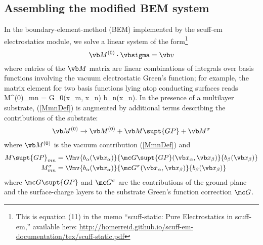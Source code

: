 \documentclass[letterpaper]{article}
\begin{document}
\newpage
\subsection{Assembling the modified BEM system}

In the boundary-element-method (BEM) implemented by the {\sc scuff-em}
electrostatics module, we solve a linear system of the form\footnote{This
is equation (11) in the memo ``{\sc scuff-static}: Pure Electrostatics 
in {\sc scuff-em},'' available here:
\url{http://homerreid.github.io/scuff-em-documentation/tex/scuff-static.pdf}}
$$ \vb M^{(0)} \cdot \vbsigma = \vb v$$
where entries of the $\vb M$ matrix are linear combinations of
integrals over basis functions involving the vacuum electrostatic
Green's function; for example, the matrix element for two basis functions
lying atop conducting surfaces reads
{
  M^{(0)}_{mn} = 
                     {G_0(\vb x_m, \vb x_n)}
                     {b_n(\vb x_n)}.
}
In the presence of a multilayer substrate, (\ref{MmnDef}) is augmented
by additional terms describing the contributions of the substrate:
$$ \vb M^{(0)} \to \vb M^{(0)} + \vb M\supt{GP} + \vb M^\sigma$$
where $\vb M^{(0)}$ is the vacuum contribution (\ref{MmnDef})
and 
\begin{align*}
  M\supt{GP}_{mn} 
   &= \Vmv{b_\alpha(\vb x_\alpha)}
          {\mc G\supt{GP}(\vb x_\alpha, \vb x_\beta)}
          {b_\beta(\vb x_\beta)}
\\
  M^\sigma_{mn} 
   &= \Vmv{b_\alpha(\vb x_\alpha)}
          {\mc G^\sigma(\vb x_\alpha, \vb x_\beta)}
          {b_\beta(\vb x_\beta)}
\end{align*}
where $\mc G\supt{GP}$ and $\mc G^\sigma$ are the contributions
of the ground plane and the surface-charge layers to 
the substrate Green's function correction $\mc G$.
\end{document}
